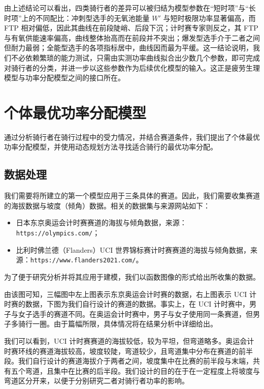 \documentclass[11pt,a4paper]{ctexart}
\begin{document}
由上述结论可以看出，四类骑行者的差异可以被归结为模型参数在“短时项”与“长时项”上的不同配比：冲刺型选手的无氧池能量 $W'$ 与短时极限功率显著偏高，而 FTP 相对偏低，因此其曲线在前段陡峭、后段下沉；计时赛专家则反之，其 FTP 与有氧供能速率偏高，曲线整体抬高而在前段并不突出；爆发型选手介于二者之间但耐力最弱；全能型选手的各项指标居中，曲线因而最为平缓。这一结论说明，我们不必依赖繁琐的能力测试，只需由实测功率曲线拟合出少数几个参数，即可完成对骑行者的分类，并进一步以这些参数作为后续优化模型的输入。这正是疲劳生理模型与功率分配模型之间的接口所在。

\section{个体最优功率分配模型}

通过分析骑行者在骑行过程中的受力情况，并结合赛道条件，我们提出了个体最优功率分配模型，并使用动态规划方法寻找适合骑行的最优功率分配。

\subsection{数据处理}

我们需要将所建立的第一个模型应用于三条具体的赛道。因此，我们需要收集赛道的海拔数据与坡度（倾角）数据。相关的数据集与来源网站如下：

\begin{itemize}
\item 日本东京奥运会计时赛赛道的海拔与倾角数据，来源：\texttt{https://olympics.com/}；
\item 比利时佛兰德（Flanders）UCI 世界锦标赛计时赛赛道的海拔与倾角数据，来源：\texttt{https://www.flanders2021.com/}。
\end{itemize}

为了便于研究分析并将其应用于建模，我们以函数图像的形式给出所收集的数据。

由该图可知，三幅图中左上图表示东京奥运会计时赛的数据，右上图表示 UCI 计时赛的数据，下图为我们自行设计的赛道的数据。事实上，在 UCI 计时赛中，男子与女子选手的赛道不同。在奥运会计时赛中，男子与女子使用同一条赛道，但男子多骑行一圈。由于篇幅所限，具体情况将在结果分析中详细给出。

我们可以看到，UCI 计时赛赛道的海拔较低，较为平坦，但弯道略多。奥运会计时赛环线的赛道海拔较高，坡度较陡，弯道较少，且弯道集中分布在赛道的前半段。我们自行设计的赛道海拔介于两者之间，坡度集中在比赛的前半段与末端，共有五个弯道，且集中在比赛的后半段。我们设计的目的在于在一定程度上将坡度与弯道区分开来，以便于分别研究二者对骑行者功率的影响。
\end{document}
